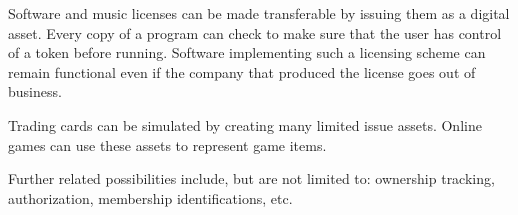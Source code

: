 Software and music licenses can be made transferable by issuing them as a
digital asset. Every copy of a program can check to make sure that the user has
control of a token before running. Software implementing such a licensing
scheme can remain functional even if the company that produced the license goes
out of business.

Trading cards can be simulated by creating many limited issue assets. Online
games can use these assets to represent game items.

Further related possibilities include, but are not limited to: ownership
tracking, authorization, membership identifications, etc.
